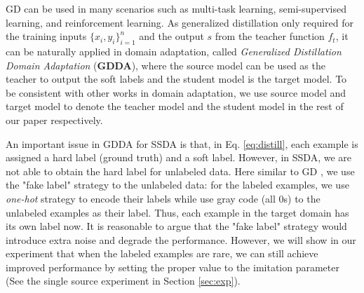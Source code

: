 GD can be used in many scenarios such as multi-task learning, semi-supervised learning, and reinforcement learning. As generalized distillation only required for the training inputs $\{x_i,y_i\}_{i=1}^n$ and the output $s$ from the teacher function $f_t$, it can be naturally applied in domain adaptation, called \textit{Generalized Distillation Domain Adaptation} (\textbf{GDDA}), where the source model can be used as the teacher to output the soft labels and the student model is the target model. To be consistent with other works in domain adaptation, we use source model and target model to denote the teacher model and the student model in the rest of our paper respectively.

An important issue in GDDA for SSDA is that, in Eq. \eqref{eq:distill}, each example is assigned a hard label (ground truth) and a soft label. However, in SSDA, we are not able to obtain the hard label for unlabeled data. Here similar to GD \cite{lopez2015unifying}, we use the "fake label" strategy to the unlabeled data: for the labeled examples, we use \textit{one-hot} strategy to encode their labels while use gray code (all 0s) to the unlabeled examples as their label. Thus, each example in the target domain has its own label now. It is reasonable to argue that the "fake label" strategy would introduce extra noise and degrade the performance. However, we will show in our experiment that when the labeled examples are rare, we can still achieve improved performance by setting the proper value to the imitation parameter (See the single source experiment in Section \ref{sec:exp}).

